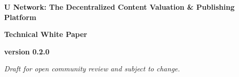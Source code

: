 \documentclass[12pt,twoside]{mitthesis}
\begin{document}
\begin{center}
\large\textbf{U Network: The Decentralized Content Valuation \& Publishing Platform}
\end{center}
\vspace{1cm}


\begin{center}
\large\textbf{Technical White Paper}
\end{center}

\begin{center}
\textbf{version 0.2.0}

\end{center}
\vspace{4cm}

\begin{center}
\textit{Draft for open community review and subject to change.}
\end{center}

\pagestyle{empty}




\pagestyle{plain}














\appendix


%




\end{document}
